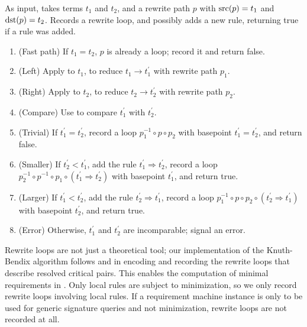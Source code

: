 \documentclass[../generics]{subfiles}
\begin{document}
\begin{algorithm}\label{add rule derived algo}
As input, takes terms $t_1$ and $t_2$, and a rewrite path $p$ with $\operatorname{src}(p)=t_1$ and $\operatorname{dst}(p)=t_2$. Records a rewrite loop, and possibly adds a new rule, returning true if a rule was added.
\begin{enumerate}
\item (Fast path) If $t_1=t_2$, $p$ is already a loop; record it and return false.
\item (Left) Apply  to $t_1$, to reduce $t_1\rightarrow t_1^\prime$ with rewrite path $p_1$.
\item (Right) Apply  to $t_2$, to reduce $t_2\rightarrow t_2^\prime$ with rewrite path $p_2$.
\item (Compare) Use  to compare $t_1^\prime$ with $t_2^\prime$.
\item (Trivial) If $t_1^\prime=t_2^\prime$, record a loop $p_1^{-1}\circ p\circ p_2$ with basepoint $t_1^\prime=t_2^\prime$, and return false.
\item (Smaller) If $t_2^\prime<t_1^\prime$, add the rule $t_1^\prime\Rightarrow t_2^\prime$, record a loop $p_2^{-1}\circ p^{-1}\circ p_1\circ (t_1^\prime\Rightarrow t_2^\prime)$ with basepoint $t_1^\prime$, and return true.
\item (Larger) If $t_1^\prime<t_2^\prime$, add the rule $t_2^\prime\Rightarrow t_1^\prime$, record a loop $p_1^{-1}\circ p \circ p_2 \circ (t_2^\prime\Rightarrow t_1^\prime)$ with basepoint $t_2^\prime$, and return true.
\item (Error) Otherwise, $t_1^\prime$ and $t_2^\prime$ are incomparable; signal an error.
\end{enumerate}
\end{algorithm}
Rewrite loops are not just a theoretical tool; our implementation of the Knuth-Bendix algorithm follows \cite{loggedrewriting} and \cite{homotopicalcompletion} in encoding and recording the rewrite loops that describe resolved critical pairs. This enables the computation of minimal requirements in . Only local rules are subject to minimization, so we only record rewrite loops involving local rules. If a requirement machine instance is only to be used for generic signature queries and not minimization, rewrite loops are not recorded at all.
\end{document}
